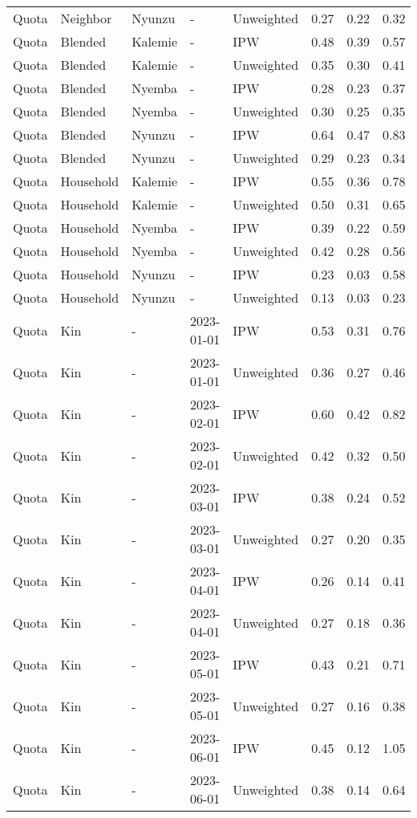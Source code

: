 \begin{longtable}[t]{lllllrrr}
Quota & Neighbor & Nyunzu & - & Unweighted & 0.27 & 0.22 & 0.32\\
Quota & Blended & Kalemie & - & IPW & 0.48 & 0.39 & 0.57\\
\addlinespace
Quota & Blended & Kalemie & - & Unweighted & 0.35 & 0.30 & 0.41\\
Quota & Blended & Nyemba & - & IPW & 0.28 & 0.23 & 0.37\\
Quota & Blended & Nyemba & - & Unweighted & 0.30 & 0.25 & 0.35\\
Quota & Blended & Nyunzu & - & IPW & 0.64 & 0.47 & 0.83\\
Quota & Blended & Nyunzu & - & Unweighted & 0.29 & 0.23 & 0.34\\
\addlinespace
Quota & Household & Kalemie & - & IPW & 0.55 & 0.36 & 0.78\\
Quota & Household & Kalemie & - & Unweighted & 0.50 & 0.31 & 0.65\\
Quota & Household & Nyemba & - & IPW & 0.39 & 0.22 & 0.59\\
Quota & Household & Nyemba & - & Unweighted & 0.42 & 0.28 & 0.56\\
Quota & Household & Nyunzu & - & IPW & 0.23 & 0.03 & 0.58\\
\addlinespace
Quota & Household & Nyunzu & - & Unweighted & 0.13 & 0.03 & 0.23\\
Quota & Kin & - & 2023-01-01 & IPW & 0.53 & 0.31 & 0.76\\
Quota & Kin & - & 2023-01-01 & Unweighted & 0.36 & 0.27 & 0.46\\
Quota & Kin & - & 2023-02-01 & IPW & 0.60 & 0.42 & 0.82\\
Quota & Kin & - & 2023-02-01 & Unweighted & 0.42 & 0.32 & 0.50\\
\addlinespace
Quota & Kin & - & 2023-03-01 & IPW & 0.38 & 0.24 & 0.52\\
Quota & Kin & - & 2023-03-01 & Unweighted & 0.27 & 0.20 & 0.35\\
Quota & Kin & - & 2023-04-01 & IPW & 0.26 & 0.14 & 0.41\\
Quota & Kin & - & 2023-04-01 & Unweighted & 0.27 & 0.18 & 0.36\\
Quota & Kin & - & 2023-05-01 & IPW & 0.43 & 0.21 & 0.71\\
\addlinespace
Quota & Kin & - & 2023-05-01 & Unweighted & 0.27 & 0.16 & 0.38\\
Quota & Kin & - & 2023-06-01 & IPW & 0.45 & 0.12 & 1.05\\
Quota & Kin & - & 2023-06-01 & Unweighted & 0.38 & 0.14 & 0.64\\

\end{longtable}
